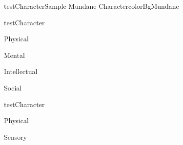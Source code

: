 \begin{actorCardLetterSizeFitToPage}{testCharacter}{Sample Mundane Character}{colorBgMundane}

	\begin{capabilitiesBox}{testCharacter}
		\begin{capabilitiesTable}{Physical}
		\end{capabilitiesTable}
		\begin{capabilitiesTable}{Mental}
		\end{capabilitiesTable}
		\begin{capabilitiesTable}{Intellectual}
		\end{capabilitiesTable}
		\begin{capabilitiesTable}{Social}
	   \end{capabilitiesTable}
	\end{capabilitiesBox}

	\begin{speciesBonusBox}{testCharacter}
		\begin{bonusTable}{Physical}
		\end{bonusTable}
		\begin{bonusTable}{Sensory}
		\end{bonusTable}
	\end{speciesBonusBox}


\end{actorCardLetterSizeFitToPage}

